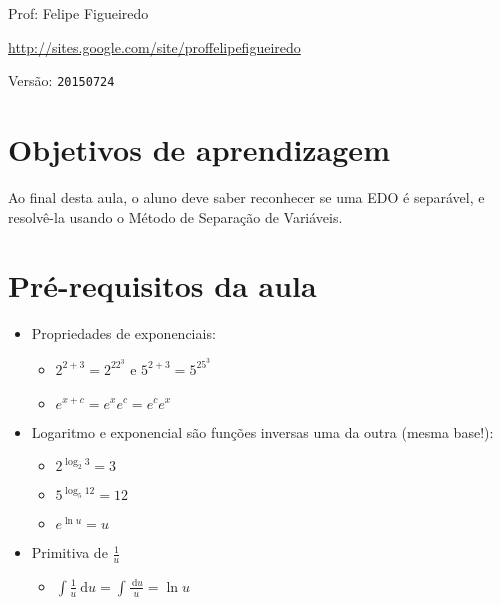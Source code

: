 \documentclass[a4paper]{article}
\newcommand{\ud}{\mathrm{\ d}}
\begin{document}
\parbox[c]{.825\textwidth}{\raggedright%
{Prof: Felipe Figueiredo\par}
{\url{http://sites.google.com/site/proffelipefigueiredo}\par}
}

Versão: \verb|20150724|



\section{Objetivos de aprendizagem}

Ao final desta aula, o aluno deve saber reconhecer se uma EDO é
separável, e resolvê-la usando o Método de Separação de Variáveis.

\section{Pré-requisitos da aula}

\begin{multicols}{2}
\begin{itemize}
\item Propriedades de exponenciais:
  \begin{itemize}
  \item $2^{2+3} = 2^22^3$ e $5^{2+3} = 5^25^3$
  \item $e^{x+c} = e^xe^c = e^ce^x$
  \end{itemize}
\item Logaritmo e exponencial são funções inversas uma da outra (mesma
  base!):
  \begin{itemize}
  \item $2^{\log_2 3} = 3$
  \item $5^{\log_5 12} = 12$
  \item $e^{\ln u} = u$
  \end{itemize}
\item Primitiva de $\frac{1}{u}$
  \begin{itemize}
  \item $\int \frac{1}{u} \ud u = \int \frac{\ud u}{u} = \ln u$
  \end{itemize}
\end{itemize}
\end{multicols}
\end{document}
